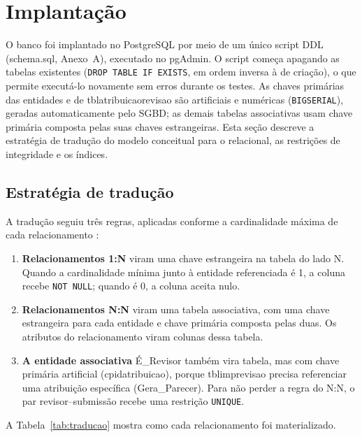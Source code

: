 \documentclass[12pt,a4paper]{article}
\newcommand{\tbus}{\textunderscore\allowbreak}
\newcommand{\tb}[1]{{\ttfamily\let\_\tbus #1}}
\newcommand{\rel}[1]{\textsf{#1}}
\begin{document}
\section{Implantação}\label{sec:implantacao}
O banco foi implantado no PostgreSQL \citep{postgresql} por meio de um único script
DDL (\tb{schema.sql}, Anexo~A), executado no pgAdmin. O script começa apagando as
tabelas existentes (\texttt{DROP TABLE IF EXISTS}, em ordem inversa à de criação), o
que permite executá-lo novamente sem erros durante os testes. As chaves primárias das
entidades e de \tb{tbl\_atribuicao\_revisao} são artificiais e numéricas
(\texttt{BIGSERIAL}), geradas automaticamente pelo SGBD; as demais tabelas associativas
usam chave primária composta pelas suas chaves estrangeiras. Esta seção descreve a estratégia de tradução do modelo conceitual para o
relacional, as restrições de integridade e os índices.

\subsection{Estratégia de tradução}
A tradução seguiu três regras, aplicadas conforme a cardinalidade máxima de cada
relacionamento \citep{heuser2009}:
\begin{enumerate}
    \item \textbf{Relacionamentos 1:N} viram uma chave estrangeira na tabela do lado N.
    Quando a cardinalidade mínima junto à entidade referenciada é 1, a coluna recebe
    \texttt{NOT NULL}; quando é 0, a coluna aceita nulo.
    \item \textbf{Relacionamentos N:N} viram uma tabela associativa, com uma chave
    estrangeira para cada entidade e chave primária composta pelas duas. Os atributos do
    relacionamento viram colunas dessa tabela.
    \item \textbf{A entidade associativa} \rel{É\_Revisor} também vira tabela, mas com
    chave primária artificial (\tb{cp\_id\_atribuicao}), porque \tb{tbl\_imp\_revisao}
    precisa referenciar uma atribuição específica (\rel{Gera\_Parecer}). Para não perder
    a regra do N:N, o par revisor--submissão recebe uma restrição \texttt{UNIQUE}.
\end{enumerate}

A Tabela~\ref{tab:traducao} mostra como cada relacionamento foi materializado.
\end{document}
